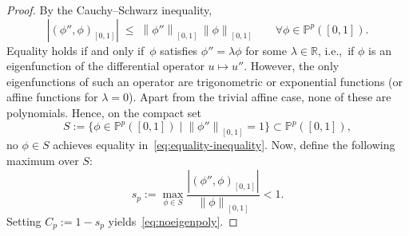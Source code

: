 \documentclass[a4paper,twoside,10pt]{article}
\newcommand*{\norm}[1]{\left\|#1\right\|}
\newcommand{\IP}{\mathbb{P}}
\newcommand{\IR}{\mathbb{R}}
\numberwithin{equation}{section}
\begin{document}
		\begin{proof}
		By the Cauchy--Schwarz inequality,
		\begin{equation}
        \label{eq:equality-inequality}
		|( \phi'', \phi)_{[0,1]} | \;\le\; \norm{\phi''}_{[0,1]} \,\norm{\phi}_{[0,1]} \qquad \forall \phi \in \IP^p([0,1]).
		\end{equation}
		Equality holds if and only if~$\phi$ satisfies $\phi''=\lambda \phi$ for some $\lambda\in\IR$, i.e.,\ if $\phi$ is an eigenfunction of the differential operator $u\mapsto u''$. However, the only 
        eigenfunctions of such an operator are trigonometric or exponential functions (or affine functions for $\lambda=0$). 
		Apart from the trivial affine case, none of these are polynomials. 
        Hence, on the compact set
		\begin{equation*}
		S := \{\phi \in \IP^p([0,1]) \mid \norm{\phi''}_{[0,1]} = 1\} \subset \IP^p([0,1]),
		\end{equation*}
		no $\phi\in S$ achieves equality in~\eqref{eq:equality-inequality}.  
		Now, define the following maximum over $S$:
		\begin{equation*}
		s_p := \max_{\phi \in S}\frac{ |(  \phi'', \phi)_{[0,1]} |}{  \norm{\phi}_{[0,1]}} < 1.
		\end{equation*}
		Setting $C_p := 1-s_p$ yields~\eqref{eq:noeigenpoly}.
		\end{proof}
\end{document}
